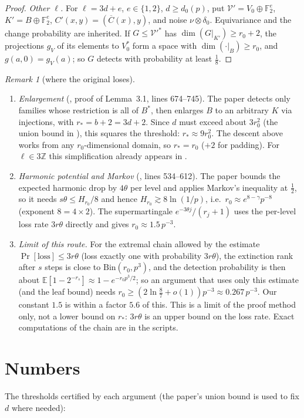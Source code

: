 \documentclass[11pt]{amsart}
\theoremstyle{remark}
\newtheorem{remark}[theorem]{Remark}
\newcommand{\E}{\mathbb E}
\newcommand{\F}{\mathbb F}
\newcommand{\cV}{\mathcal V}
\begin{document}
\begin{proof}
\emph{Other $\ell$.} For $\ell=3d+e$, $e\in\{1,2\}$, $d\ge d_0(p)$, put $\cV'=V_0\oplus\F_2^e$,
$K'=B\oplus\F_2^e$, $C'(x,y)=(\overline C(x),y)$, and noise $\nu\otimes\delta_0$. Equivariance and the
change probability are inherited. If $G\le\cV'^*$ has $\dim(G|_{K'})\ge r_0+2$, the projections
$g_V$ of its elements to $V_0^*$ form a space with $\dim(\cdot|_B)\ge r_0$, and $g(a,0)=g_V(a)$;
so $G$ detects with probability at least $\frac18$.
\end{proof}

\begin{remark}[where the original loses]
\leavevmode
\begin{enumerate}
\item \emph{Enlargement} (\cite{oai}, proof of Lemma~3.1, lines 674--745). The paper detects only
families whose restriction is all of $B^*$, then enlarges $B$ to an arbitrary $K$ via injections,
with $r_*=b+2=3d+2$. Since $d$ must exceed about $3r_0^2$ (the union bound in \cite[Lemma~3.6]{oai}),
this squares the threshold: $r_*\approx9r_0^2$. The descent above works from any $r_0$-dimensional
domain, so $r_*=r_0$ ($+2$ for padding). For $\ell\in3\mathbb Z$ this simplification already appears
in \cite{lgb}.
\item \emph{Harmonic potential and Markov} (\cite{oai}, lines 534--612). The paper bounds the
expected harmonic drop by $4\theta$ per level and applies Markov's inequality at $\frac12$, so it
needs $s\theta\le H_{r_0}/8$ and hence $H_{r_0}\gtrsim8\ln(1/p)$, i.e.\ $r_0\approx e^{8-\gamma}p^{-8}$
(exponent $8=4\times2$). The supermartingale $e^{-3\theta j}/(r_j+1)$ uses the per-level loss rate
$3r\theta$ directly and gives $r_0\approx1.5\,p^{-3}$.
\item \emph{Limit of this route.} For the extremal chain allowed by the estimate
$\Pr[\text{loss}]\le3r\theta$ (loss exactly one with probability $3r\theta$), the extinction
rank after $s$ steps is close to $\mathrm{Bin}(r_0,p^3)$, and the detection probability is then about
$\E[1-2^{-r_s}]\approx1-e^{-r_0p^3/2}$; so an argument that uses only this estimate (and the leaf
bound) needs $r_0\ge(2\ln\frac87+o(1))p^{-3}\approx0.267\,p^{-3}$. Our constant $1.5$ is within a
factor $5.6$ of this. This is a limit of the proof method only, not a lower bound on $r_*$:
$3r\theta$ is an upper bound on the loss rate. Exact computations of the chain are in the scripts.
\end{enumerate}
\end{remark}

\section{Numbers}
The thresholds certified by each argument (the paper's union bound is used to fix $d$ where needed):
\end{document}
